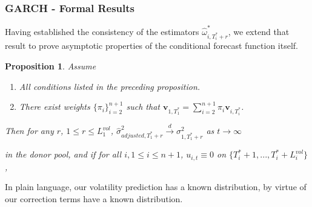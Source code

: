 \documentclass[9pt]{beamer}
\newcommand{\weight}{\pi}
\newtheorem{prop}{Proposition}
\theoremstyle{definition}
\begin{document}
    \begin{frame}\frametitle{GARCH - Formal Results} 

    Having established the consistency of the estimators $\hat\omega^{*}_{i,T_{i}^{*}+r}$, we extend that result to prove asymptotic properties of the conditional forecast function itself.
    
      \begin{prop}
        Assume
        \begin{enumerate}
          \item All conditions listed in the preceding proposition.
          \item There exist weights $\{\pi_{i}\}_{i=2}^{n+1}$ such that $\textbf{v}_{1,T_{1}^{*}} = \sum^{n+1}_{i=2}\weight_{i} \textbf{v}_{i,T_{i}^{*}}$.
         \end{enumerate}

      Then for any $r$, $1\leq r \leq L_{1}^{vol}$, $\hat\sigma^{2}_{adjusted,T_{1}^{*}+r}\overset{d}{\longrightarrow}\sigma^{2}_{1,T_{1}^{*}+r}$ as $t\rightarrow\infty$ 
      
    in the donor pool, and if for all $i, 1 \leq i \leq n+ 1$, $u_{i,t} \equiv 0$ on $\{T^{*}_{i}+1,... ,T^{*}_{i}+L_{i}^{vol}\}$, 
    

      \end{prop}

      In plain language, our volatility prediction has a known distribution, by virtue of our correction terms have a known distribution.

\end{frame}


\end{document}
